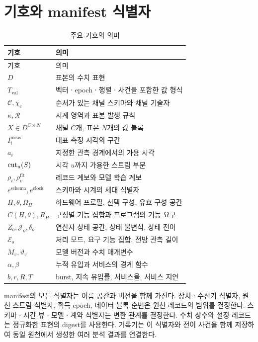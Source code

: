 \section{기호와 manifest 식별자}
\label{app:symbols}
\begin{longtable}{@{}P{.20\linewidth}P{.74\linewidth}@{}}
\caption{주요 기호의 의미}\\
\toprule 기호 & 의미 \\\midrule
\endfirsthead
\toprule 기호 & 의미 \\\midrule
\endhead
\bottomrule\endfoot
$D$ & 표본의 수치 표현 \\
$T_{\mathrm{val}}$ & 벡터ㆍepochㆍ행렬ㆍ사건을 포함한 값 형식 \\
$\mathcal C,\chi_c$ & 순서가 있는 채널 스키마와 채널 기술자 \\
$\kappa,\mathcal R$ & 시계 영역과 표본 발생 규칙 \\
$X\in D^{C\times N}$ & 채널 $C$개, 표본 $N$개의 값 블록 \\
$I_i^{\mathrm{meas}}$ & 대표 측정 시각의 구간 \\
$a_i$ & 지정한 관측 경계에서의 가용 시각 \\
$\operatorname{cut}_u(S)$ & 시각 $u$까지 가용한 스트림 부분 \\
$\rho_i,\rho_v^{\mathrm{fit}}$ & 레코드 계보와 모델 학습 계보 \\
$e^{\mathrm{schema}},e^{\mathrm{clock}}$ & 스키마와 시계의 세대 식별자 \\
$H,\theta,\Omega_H$ & 하드웨어 프로필, 선택 구성, 유효 구성 공간 \\
$C(H,\theta),R_P$ & 구성별 기능 집합과 프로그램의 기능 요구 \\
$Z_o,\mathcal J_o,\delta_o$ & 연산자 상태 공간, 상태 불변식, 상태 전이 \\
$\mathcal E_o$ & 처리 모드, 요구 기능 집합, 전방 관측 길이 \\
$M_v,\vartheta_v$ & 모델 버전과 수치 매개변수 \\
$\alpha,\beta$ & 누적 유입과 서비스의 경계 함수 \\
$b,r,R,T$ & burst, 지속 유입률, 서비스율, 서비스 지연 \\
\end{longtable}

manifest의 모든 식별자는 이름 공간과 버전을 함께 가진다.
장치ㆍ수신기 식별자, 원천 스트림 식별자, 획득 epoch, 데이터 블록 순번은
원천 레코드의 범위를 결정한다. 스키마ㆍ시간 뷰ㆍ모델ㆍ계약 식별자는
변환 관계를 결정한다. 수치 상수와 설정 레코드는 정규화한 표현의 digest를 사용한다.
기록기는 이 식별자와 전이 사건을 함께 저장하여 동일 원천에서 생성한 여러 분석 결과를 연결한다.
